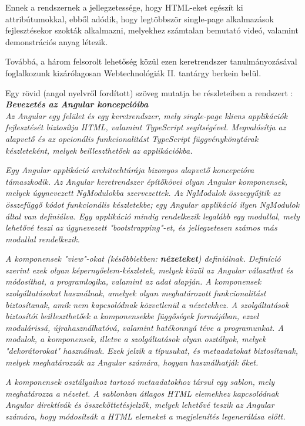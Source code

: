 Ennek a rendszernek a jellegzetessége, hogy HTML-eket egészít ki attribútumokkal, ebből adódik, hogy legtöbbször single-page alkalmazások fejlesztésekor szokták alkalmazni, melyekhez számtalan bemutató videó, valamint demonstrációs anyag létezik.

Továbbá, a három felsorolt lehetőség közül ezen keretrendszer tanulmányozásával foglalkozunk kizárólagosan Webtechnológiák II. tantárgy berkein belül.

Egy rövid (angol nyelvről fordított) szöveg mutatja be részleteiben a rendszert \cite{angularcikk}:\\

\noindent\textit{\textbf{\large{Bevezetés az Angular koncepcióiba}}}\\

\textit{Az Angular egy felület és egy keretrendszer, mely single-page kliens applikációk fejlesztését biztosítja HTML, valamint TypeScript segítségével. Megvalósítja az alapvető és az opcionális funkcionalitást TypeScript függvénykönytárak készleteként, melyek beilleszthetőek az applikációkba.}

\textit{Egy Angular applikáció architechtúrája bizonyos alapvető koncepcióra támaszkodik. Az Angular keretrendszer építőkövei olyan Angular komponensek, melyek úgynevezett NgModulokba szervezettek. Az NgModulok összegyűjtik az összefüggő kódot funkcionális készletekbe; egy Angular applikáció ilyen NgModulok által van definiálva. Egy applikáció mindig rendelkezik legalább egy modullal, mely lehetővé teszi az úgynevezett "bootstrapping"-et, és jellegzetesen számos más modullal rendelkezik.}

\textit{A komponensek "view"-okat (későbbiekben: \textbf{nézeteket}) definiálnak. Definíció szerint ezek olyan képernyőelem-készletek, melyek közül az Angular választhat és módosíthat, a programlogika, valamint az adat alapján. A komponensek szolgáltatásokat használnak, amelyek olyan meghatározott funkcionalitást biztosítanak, amik nem kapcsolódnak közvetlenül a nézetekhez. A szolgáltatások biztosítói beilleszthetőek a komponensekbe függőségek formájában, ezzel modulárissá, újrahasználhatóvá, valamint hatékonnyá téve a programunkat. A modulok, a komponensek, illetve a szolgáltatások olyan osztályok, melyek "dekorátorokat" használnak. Ezek jelzik a típusukat, és metaadatokat biztosítanak, melyek meghatározzák az Angular számára, hogyan használhatják őket.}


\textit{A komponensek osztályaihoz tartozó metaadatokhoz társul egy sablon, mely meghatározza a nézetet. A sablonban átlagos HTML elemekhez kapcsolódnak Angular direktívák és összeköttetésjelzők, melyek lehetővé teszik az Angular számára, hogy módosítsák a HTML elemeket a megjelenítés legenerálása előtt.}

